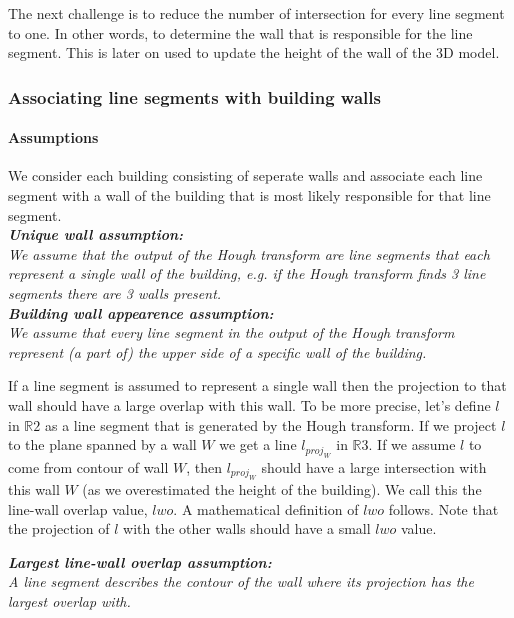 	The next challenge is to reduce the number of intersection for every line
	segment to one. In other words, to determine the wall that is responsible for
	the line segment. This is later on used to update the height of the wall of the
	3D model.\\


\subsubsection{Associating line segments with building walls}
\label{sec:lwa}
	\paragraph{Assumptions}
	We consider each building consisting of seperate walls and associate each
	line segment with a wall of the building that is most likely responsible for
	that line segment. \\
		
	\textbf{	\emph{Unique wall assumption:}}\\
	\emph{We assume that the output of the Hough transform are line segments
	that each represent a single wall of the building, e.g. if the Hough
	transform finds 3 line segments there are 3 walls present.}\\

	\textbf{	\emph{Building wall appearence assumption:}}\\
	\emph{We assume that every line segment in the output of the Hough transform represent (a part of) the upper side of
	a specific wall of the building.}

	If a line segment is assumed to represent a single wall then the projection
	to that wall should have a large overlap with this wall.  To be more
	precise, let's define $l$ in $\mathbb{R}2$ as a line segment that is
	generated by the Hough transform.  If we project $l$ to the plane spanned
	by a wall $W$ we get a line $l_{proj_W}$ in $\mathbb{R}3$.  If we assume
	$l$ to come from contour of wall $W$, then $l_{proj_W}$ should have a large
	intersection with this wall $W$ (as we overestimated the height of the
	building). We call this the line-wall overlap value, $lwo$.  A mathematical
	definition of $lwo$ follows.  Note that the projection of $l$ with the
	other walls should have a small $lwo$ value.

	\textbf{	\emph{Largest line-wall overlap assumption:}}\\
	\emph{A line segment describes the contour of the wall where its projection
	has the largest overlap with.}\\

